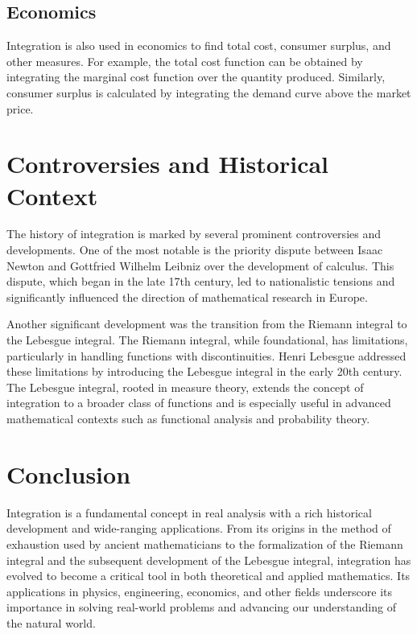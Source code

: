 \documentclass[12pt]{article}
\begin{document}
\subsection{Economics}
Integration is also used in economics to find total cost, consumer surplus, and other measures. For example, the total cost function can be obtained by integrating the marginal cost function over the quantity produced. Similarly, consumer surplus is calculated by integrating the demand curve above the market price.

\section{Controversies and Historical Context}
The history of integration is marked by several prominent controversies and developments. One of the most notable is the priority dispute between Isaac Newton and Gottfried Wilhelm Leibniz over the development of calculus. This dispute, which began in the late 17th century, led to nationalistic tensions and significantly influenced the direction of mathematical research in Europe.

Another significant development was the transition from the Riemann integral to the Lebesgue integral. The Riemann integral, while foundational, has limitations, particularly in handling functions with discontinuities. Henri Lebesgue addressed these limitations by introducing the Lebesgue integral in the early 20th century. The Lebesgue integral, rooted in measure theory, extends the concept of integration to a broader class of functions and is especially useful in advanced mathematical contexts such as functional analysis and probability theory.

\section{Conclusion}
Integration is a fundamental concept in real analysis with a rich historical development and wide-ranging applications. From its origins in the method of exhaustion used by ancient mathematicians to the formalization of the Riemann integral and the subsequent development of the Lebesgue integral, integration has evolved to become a critical tool in both theoretical and applied mathematics. Its applications in physics, engineering, economics, and other fields underscore its importance in solving real-world problems and advancing our understanding of the natural world.
\end{document}
